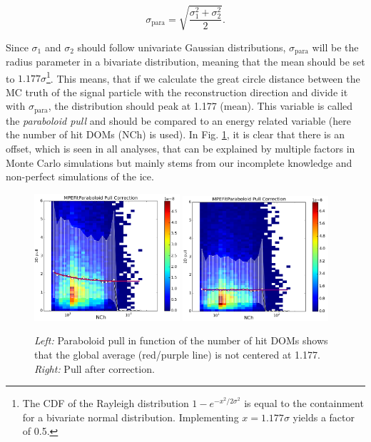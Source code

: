 \begin{equation}
\sigma_\textrm{para} = \sqrt{\frac{\sigma_1^2 + \sigma_2^2}{2}}.
\end{equation}

\noindent Since $\sigma_1$ and $\sigma_2$ should follow univariate Gaussian distributions, $\sigma_\textrm{para}$ will be the radius parameter in a bivariate distribution, meaning that the mean should be set to $1.177\sigma$\footnote{The CDF of the Rayleigh distribution $1-e^{-x^2/2\sigma^2}$ is equal to the containment for a bivariate normal distribution. Implementing $x=1.177\sigma$ yields a factor of 0.5.}. This means, that if we calculate the great circle distance between the MC truth of the signal particle with the reconstruction direction and divide it with $\sigma_\textrm{para}$, the distribution should peak at 1.177 (mean). This variable is called the \textit{paraboloid pull} and should be compared to an energy related variable (here the number of hit DOMs (NCh) is used). In Fig. \ref{fig:paraboloidpull}, it is clear that there is an offset, which is seen in all analyses, that can be explained by multiple factors in Monte Carlo simulations but mainly stems from our incomplete knowledge and non-perfect simulations of the ice.

\begin{figure}[t]
\centering
\includegraphics[width=0.48\textwidth]{chapter7/img/pullbeforecorrection.png}
\includegraphics[width=0.48\textwidth]{chapter7/img/pullaftercorrection.png}
\caption{\textit{Left: }Paraboloid pull in function of the number of hit DOMs shows that the global average (red/purple line) is not centered at 1.177. \textit{Right: }Pull after correction.}
\label{fig:paraboloidpull}
\end{figure}

